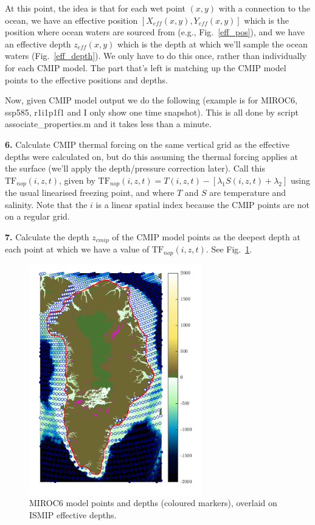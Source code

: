 \documentclass[11pt]{article}
\begin{document}
At this point, the idea is that for each wet point $(x,y)$ with a connection to the ocean, we have an effective position $[X_{eff}(x,y), Y_{eff}(x,y)]$ which is the position where ocean waters are sourced from (e.g., Fig.~\ref{eff_pos}), and we have an effective depth $z_{eff}(x,y)$ which is the depth at which we’ll sample the ocean waters (Fig.~\ref{eff_depth}). We only have to do this once, rather than individually for each CMIP model. The part that’s left is matching up the CMIP model points to the effective positions and depths.

Now, given CMIP model output we do the following (example is for MIROC6, ssp585, r1i1p1f1 and I only show one time snapshot). This is all done by script associate\_properties.m and it takes less than a minute.

\textbf{6.} Calculate CMIP thermal forcing on the same vertical grid as the effective depths were calculated on, but do this assuming the thermal forcing applies at the surface (we'll apply the depth/pressure correction later). Call this $\text{TF}_{nop}(i,z,t)$, given by $\text{TF}_{nop}(i,z,t)=T(i,z,t)-\left[\lambda_1S(i,z,t)+\lambda_2\right]$ using the usual linearised freezing point, and where $T$ and $S$ are temperature and salinity. Note that the $i$ is a linear spatial index because the CMIP points are not on a regular grid.

\textbf{7.} Calculate the depth $z_{cmip}$ of the CMIP model points as the deepest depth at each point at which we have a value of $\text{TF}_{nop}(i,z,t)$. See Fig.~\ref{cmip_depth}.

\begin{figure}[h!]
\centering
\includegraphics[width=7.5cm]{cmip_depth.png}
\caption{MIROC6 model points and depths (coloured markers), overlaid on ISMIP effective depths.}
\label{cmip_depth}
\end{figure}
\end{document}
